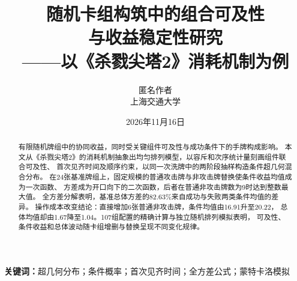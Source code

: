 \documentclass[UTF8,a4paper,zihao=-4,fontset=fandol]{ctexart}
\title{\vspace{-1.4em}\zihao{3}\bfseries 随机卡组构筑中的组合可及性\\与收益稳定性研究\\[0.3em]
  \zihao{-3}——以《杀戮尖塔2》消耗机制为例}
\author{\normalsize 匿名作者\\[-0.1em]
  \small 上海交通大学}
\date{\small 2026年11月16日}
\numberwithin{equation}{section}
\begin{document}
\maketitle
\vspace{-1.2em}
\begin{abstract}
有限随机牌组中的协同收益，同时受关键组件可及性与成功条件下的手牌构成影响。
本文从《杀戮尖塔2》的消耗机制抽象出均匀排列模型，以容斥和次序统计量刻画组件联合可及性、
首次见齐时间及顺序约束，以同一次洗牌中的两阶段抽样构造条件超几何混合分布。
在24张基准牌组上，固定规模的普通攻击牌与非攻击牌替换使条件收益均值成为一次函数、
方差成为开口向下的二次函数，后者在普通非攻击牌数为9时达到整数最大值。
全方差分解表明，基准总体方差的82.63\%来自成功与失败两类条件均值的差异。
操作成本改变结论：直接增加6张普通非攻击牌，条件均值由16.91升至20.22，
总体均值却由1.67降至1.04。107组配置的精确计算与独立随机排列模拟表明，
可及性、条件收益和总体波动随卡组增删与替换呈现不同变化规律。
\end{abstract}
\noindent\textbf{关键词：}超几何分布；条件概率；首次见齐时间；全方差公式；蒙特卡洛模拟


\FloatBarrier



\label{maintext:end}
\FloatBarrier
\clearpage

{\small\raggedright

\par}

\end{document}
